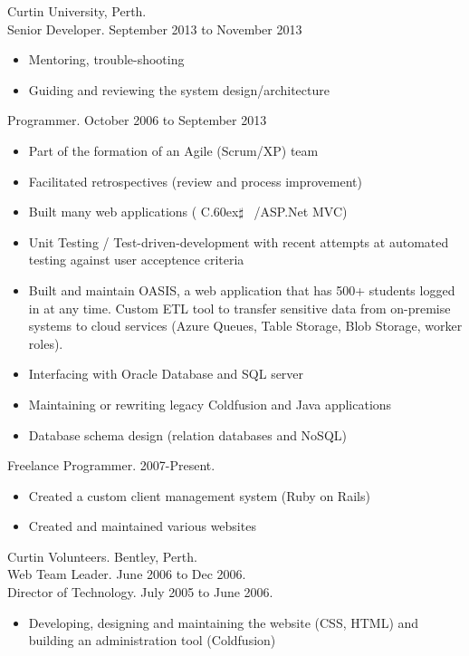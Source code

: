 \documentclass[margin]{res}
\def\Csharp{%
    C\raise.60ex\hbox{$\sharp$}%
\spacefactor1000 }
\begin{document}
\begin{resume}
  Curtin University, Perth.\\
  Senior Developer. September 2013 to November 2013
  \begin{itemize}
    \item Mentoring, trouble-shooting
    \item Guiding and reviewing the system design/architecture
  \end{itemize}
  \vspace{-0.1in}
  Programmer. October 2006 to September 2013
  \begin{itemize}
    \item Part of the formation of an Agile (Scrum/XP) team
    \item Facilitated retrospectives (review and process improvement)
    \item Built many web applications (\Csharp\ /ASP.Net MVC)
    \item Unit Testing / Test-driven-development with recent attempts at automated testing against user acceptence criteria 
    \item Built and maintain OASIS, a web application
            that has 500+ students logged in at any time. Custom ETL tool to transfer sensitive data from on-premise systems to cloud services (Azure Queues, Table Storage, Blob Storage, worker roles).
    \item Interfacing with Oracle Database and SQL server
    \item Maintaining or rewriting legacy Coldfusion and Java applications
    \item Database schema design (relation databases and NoSQL)
  \end{itemize}
  
  Freelance Programmer. 2007-Present.
  \begin{itemize}
    \item Created a custom client management system (Ruby on Rails)
    \item Created and maintained various websites
  \end{itemize} 
  
  Curtin Volunteers. Bentley, Perth. \\
  Web Team Leader.  June 2006 to Dec 2006.\\
  Director of Technology.  July 2005 to June 2006.
  \begin{itemize}
    \item Developing, designing and maintaining the website (CSS, HTML) and building an administration tool (Coldfusion)
  \end{itemize} 


\end{resume}
\end{document}
